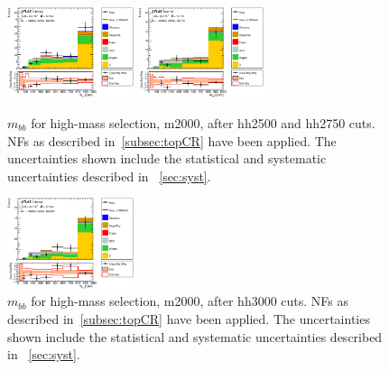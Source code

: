 \begin{figure}[!h]
\begin{center}
\includegraphics*[width=0.33\textwidth] {figures/ControlPlots/reOpt2000_bbMass_allMhh/C_reOpt2000_bbpt350_wwpt250_drww15_hh2500_bbMass_regionA_met25d020}
\includegraphics*[width=0.33\textwidth] {figures/ControlPlots/reOpt2000_bbMass_allMhh/C_reOpt2000_bbpt350_wwpt250_drww15_hh2750_bbMass_regionA_met25d020}
\caption[$m_{bb}$ for low-mass selection, m2000, after hh2500 and hh2750 cuts.]{$m_{bb}$ for high-mass selection, m2000, after hh2500 and hh2750 cuts. \ttbar NFs as described in~\ref{subsec:topCR} have been applied. The uncertainties shown include the statistical and systematic uncertainties described in ~\ref{sec:syst}.}
\end{center}
\end{figure}

\begin{figure}[!h]
\begin{center}
\includegraphics*[width=0.33\textwidth] {figures/ControlPlots/reOpt2000_bbMass_allMhh/C_reOpt2000_bbpt350_wwpt250_drww15_hh3000_bbMass_regionA_met25d020}
\caption[$m_{bb}$ for low-mass selection, m2000, after hh3000.]{$m_{bb}$ for high-mass selection, m2000, after hh3000 cuts. \ttbar NFs as described in~\ref{subsec:topCR} have been applied. The uncertainties shown include the statistical and systematic uncertainties described in ~\ref{sec:syst}.}
\end{center}
\end{figure}
